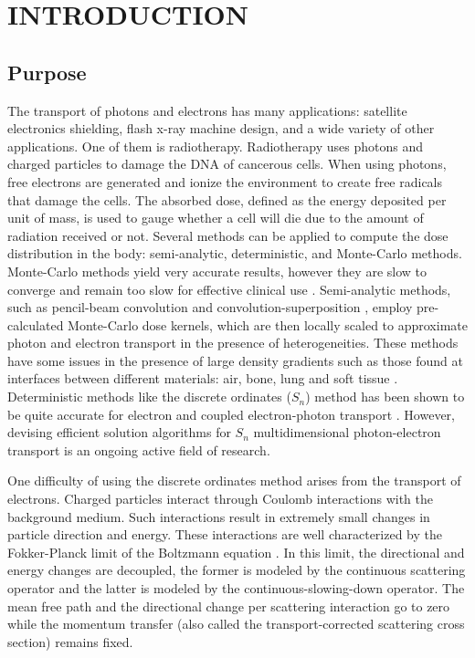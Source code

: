 \pagestyle{plain}
\setcounter{page}{1}
\chapter{\uppercase{Introduction}}
\section{Purpose}
The transport of photons and electrons has many applications: satellite
electronics shielding, flash x-ray machine design, and a wide variety of other
applications. One of them is 
radiotherapy. Radiotherapy uses photons and charged particles to 
damage the DNA of cancerous cells. When using photons, free electrons are 
generated and ionize the environment to create free radicals that damage the cells. 
The absorbed dose, defined as the energy deposited per unit of mass, is used to 
gauge whether a cell will die due to the amount of radiation received or not. 
Several methods can be
applied to compute the dose distribution in the body: semi-analytic,
deterministic, and Monte-Carlo methods. Monte-Carlo methods yield very
accurate results, however they are slow to converge and remain too slow for
effective clinical use \cite{acuros,comet}. Semi-analytic methods, such as
pencil-beam convolution \cite{pencil_beam_2,pencil_beam_1} and 
convolution-superposition \cite{superposition}, employ pre-calculated
Monte-Carlo dose kernels, which are then locally scaled to approximate photon
and electron transport in the presence of heterogeneities. These methods
have some issues in the presence of large density gradients such as those
found at interfaces between different materials: air, bone, lung and soft
tissue \cite{krieger,seco,acuros}. Deterministic methods like the discrete 
ordinates ($S_n$) method has been shown to be quite accurate for electron and 
coupled electron-photon transport \cite{accuracy_2,morel_81,accuracy_1}.
However, devising efficient solution algorithms for $S_n$ multidimensional
photon-electron transport is an ongoing active field of research.

One difficulty of using the discrete ordinates method arises from the transport 
of electrons. Charged particles interact through Coulomb interactions with the 
background medium. Such interactions result in extremely small changes in particle 
direction and energy. These interactions are well characterized by the 
Fokker-Planck limit of the Boltzmann equation \cite{fp_limit,morel_96}. In this 
limit, the directional and energy changes are decoupled, the former is modeled 
by the continuous scattering operator and the latter is modeled by the 
continuous-slowing-down operator. The mean free path and the directional 
change per scattering interaction go to zero while the momentum transfer (also 
called the transport-corrected scattering cross section) remains fixed.

